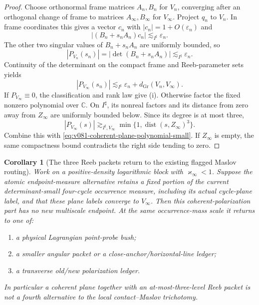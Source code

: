 \documentclass[10pt]{article}
\newtheorem{corollary}[theorem]{Corollary}
\newcommand{\dist}{\operatorname{dist}}
\newcommand{\Gr}{\operatorname{Gr}}
\begin{document}
\begin{proof}
Choose orthonormal frame matrices \(A_n,B_n\) for \(V_n\), converging after an orthogonal change of
frame to matrices \(A_\infty,B_\infty\) for \(V_\infty\).  Project \(q_n\) to \(V_n\).  In frame
coordinates this gives a vector \(c_n\) with \(|c_n|=1+O(\varepsilon_n)\) and
\[
|(B_n+s_nA_n)c_n|
\lesssim_{I^\sharp}
\varepsilon_n.
\]
The other two singular values of \(B_n+s_nA_n\) are uniformly bounded, so
\[
|P_{V_n}(s_n)|
=
|\det(B_n+s_nA_n)|
\lesssim_{I^\sharp}
\varepsilon_n.
\]
Continuity of the determinant on the compact frame and Reeb-parameter sets yields
\begin{equation}
\label{eq:v081-coherent-plane-polynomial-small}
|P_{V_\infty}(s_n)|
\lesssim_{I^\sharp}
\varepsilon_n+d_{\Gr}(V_n,V_\infty).
\end{equation}
If \(P_{V_\infty}\equiv0\), the classification and rank law give \textnormal{(i)}.  Otherwise factor
the fixed nonzero polynomial over \(\mathbb C\).  On \(I^\sharp\), its nonreal factors and its
distance from zero away from \(Z_\infty\) are uniformly bounded below.  Since its degree is at most
three,
\[
|P_{V_\infty}(s)|
\gtrsim_{I^\sharp,V_\infty}
\min\{1,\dist(s,Z_\infty)^3\}.
\]
Combine this with \eqref{eq:v081-coherent-plane-polynomial-small}.  If \(Z_\infty\) is empty, the
same compactness bound contradicts the right side tending to zero.
\end{proof}

\begin{corollary}[The three Reeb packets return to the existing flagged Maslov routing]
\label{cor:v081-three-time-packets-reroute}
Work on a positive-density logarithmic block with \(\varkappa_\infty<1\).  Suppose the atomic
endpoint-measure alternative retains a fixed portion of the current determinant-small four-cycle
occurrence measure, including its actual cycle-plane label, and that these plane labels converge to
\(V_\infty\).  Then this coherent-polarization part has no new multiscale endpoint.  At the same
occurrence-mass scale it returns to one of:
\begin{enumerate}[label=\textnormal{(\roman*)}]
\item a physical Lagrangian point-probe bush;
\item a smaller angular packet or a close-anchor/horizontal-line ledger;
\item a transverse old/new polarization ledger.
\end{enumerate}
In particular a coherent plane together with an at-most-three-level Reeb packet is not a fourth
alternative to the local contact--Maslov trichotomy.
\end{corollary}
\end{document}
